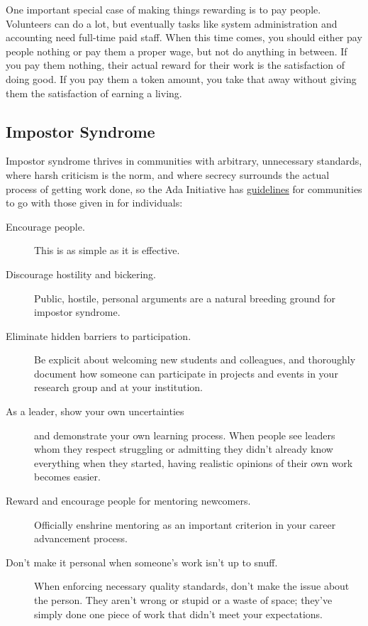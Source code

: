 One important special case of making things rewarding is to pay
people.  Volunteers can do a lot, but eventually tasks like system
administration and accounting need full-time paid staff.  When this
time comes, you should either pay people nothing or pay them a proper
wage, but not do anything in between.  If you pay them nothing, their
actual reward for their work is the satisfaction of doing good.  If
you pay them a token amount, you take that away without giving them
the satisfaction of earning a living.

\subsection*{Impostor Syndrome}

Impostor syndrome thrives in communities with arbitrary, unnecessary
standards, where harsh criticism is the norm, and where secrecy
surrounds the actual process of getting work done, so the Ada
Initiative has
\href{https://www.usenix.org/blog/impostor-syndrome-proof-yourself-and-your-community}{guidelines}
for communities to go with those given in
for individuals:

\begin{description}

\item[Encourage people.] This is as simple as it is effective.

\item[Discourage hostility and bickering.] Public, hostile, personal
  arguments are a natural breeding ground for impostor syndrome.

\item[Eliminate hidden barriers to participation.] Be explicit about
  welcoming new students and colleagues, and thoroughly document how
  someone can participate in projects and events in your research
  group and at your institution.

\item[As a leader, show your own uncertainties] and demonstrate your
  own learning process. When people see leaders whom they respect
  struggling or admitting they didn't already know everything when
  they started, having realistic opinions of their own work becomes
  easier.

\item[Reward and encourage people for mentoring newcomers.] Officially
  enshrine mentoring as an important criterion in your career
  advancement process.

\item[Don't make it personal when someone's work isn't up to snuff.]
  When enforcing necessary quality standards, don't make the issue
  about the person. They aren't wrong or stupid or a waste of space;
  they've simply done one piece of work that didn't meet your
  expectations.

\end{description}

